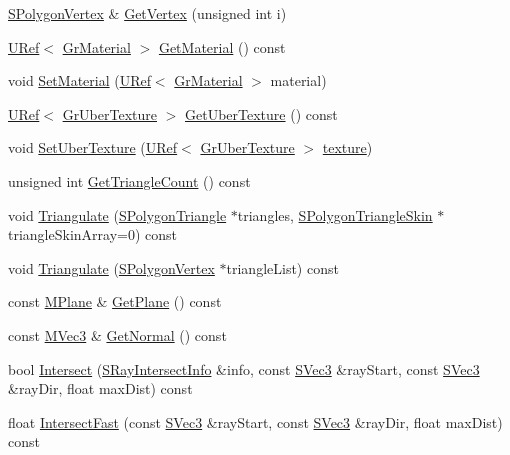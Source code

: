 \begin{CompactItemize}
\begin{CompactItemize}
\item 
\hyperlink{struct_s_polygon_vertex}{SPolygonVertex} \& \hyperlink{class_gr_polygon_fad4b14c5d81b50c943d1576657a05f0}{GetVertex} (unsigned int i)
\item 
\hyperlink{class_u_ref}{URef}$<$ \hyperlink{class_gr_material}{GrMaterial} $>$ \hyperlink{class_gr_polygon_b4a64686345e7c952395fb5432822f7d}{GetMaterial} () const 
\item 
void \hyperlink{class_gr_polygon_486be53eb2a6e5f805972ac32a0011d2}{SetMaterial} (\hyperlink{class_u_ref}{URef}$<$ \hyperlink{class_gr_material}{GrMaterial} $>$ material)
\item 
\hyperlink{class_u_ref}{URef}$<$ \hyperlink{class_gr_uber_texture}{GrUberTexture} $>$ \hyperlink{class_gr_polygon_7e2c3270815ee17025f222dc0c3be4ea}{GetUberTexture} () const 
\item 
void \hyperlink{class_gr_polygon_3b23c179792f596d818ecd94491c45a4}{SetUberTexture} (\hyperlink{class_u_ref}{URef}$<$ \hyperlink{class_gr_uber_texture}{GrUberTexture} $>$ \hyperlink{glext__bak_8h_8f486379aef534669f4f06f515e7ce6c}{texture})
\item 
unsigned int \hyperlink{class_gr_polygon_18ae3ecb1015c722fb8379d8267b9464}{GetTriangleCount} () const 
\item 
void \hyperlink{class_gr_polygon_94c81cc3e6f419a814119a7dc3c4d78b}{Triangulate} (\hyperlink{struct_s_polygon_triangle}{SPolygonTriangle} $\ast$triangles, \hyperlink{struct_s_polygon_triangle_skin}{SPolygonTriangleSkin} $\ast$triangleSkinArray=0) const 
\item 
void \hyperlink{class_gr_polygon_762d861ad057a916daf5e6b376f31ec8}{Triangulate} (\hyperlink{struct_s_polygon_vertex}{SPolygonVertex} $\ast$triangleList) const 
\item 
const \hyperlink{class_m_plane}{MPlane} \& \hyperlink{class_gr_polygon_52de5745993a825a901f9fc39c7c0fe4}{GetPlane} () const 
\item 
const \hyperlink{class_m_vec3}{MVec3} \& \hyperlink{class_gr_polygon_36a40f8b1208bdcf5f39f1ff128bafc5}{GetNormal} () const 
\item 
bool \hyperlink{class_gr_polygon_45191c8b4b5ee1943e690e27e4110562}{Intersect} (\hyperlink{struct_gr_polygon_1_1_s_ray_intersect_info}{SRayIntersectInfo} \&info, const \hyperlink{struct_s_vec3}{SVec3} \&rayStart, const \hyperlink{struct_s_vec3}{SVec3} \&rayDir, float maxDist) const 
\item 
float \hyperlink{class_gr_polygon_94a66b2b31d98fb83f6f92a863946e8e}{IntersectFast} (const \hyperlink{struct_s_vec3}{SVec3} \&rayStart, const \hyperlink{struct_s_vec3}{SVec3} \&rayDir, float maxDist) const 

\end{CompactItemize}
\end{CompactItemize}
